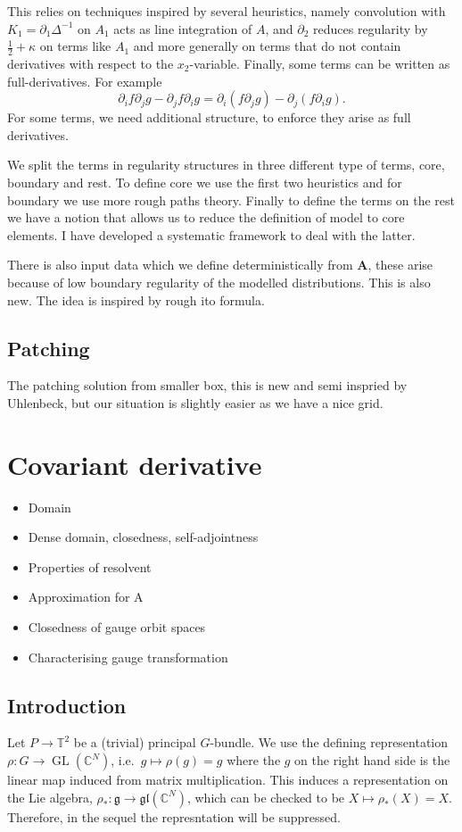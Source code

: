 \documentclass[12pt]{article}
\numberwithin{equation}{section}
\theoremstyle{definition}
\theoremstyle{remark}
\newcommand{\1}{\mathbf 1}
\newcommand{\<}{\langle}
\renewcommand{\>}{\rangle}
\newcommand{\bfA}{\mathbf A}
\newcommand{\fg}{\mathfrak g}
\newcommand{\bC}{\mathbb C}
\newcommand{\T}{\mathbb T}
\begin{document}
This relies on techniques inspired by several heuristics, namely convolution with $K_1=\partial_1 \Delta^{-1}$ on $A_1$ acts as line integration of $A$, and $\partial_2$ reduces regularity by $\frac 1 2+\kappa$ on terms like $A_1$ and more generally on terms that do not contain derivatives with respect to the $x_2$-variable. Finally, some terms can be written as full-derivatives. For example
\[
\partial_i f\partial_j g-\partial_j f\partial_i g=\partial_i (f\partial_j g)-\partial_j (f\partial_i g). 
\]
For some terms, we need additional structure, to enforce they arise as full derivatives. 

We split the terms in regularity structures in three different type of terms, core, boundary and rest. To define core we use the first two heuristics and for boundary we use more rough paths theory. Finally to define the terms on the rest we have a notion that allows us to reduce the definition of model to core elements. I have developed a systematic framework to deal with the latter. 

There is also input data which we define deterministically from $\bfA$, these arise because of low boundary regularity of the modelled distributions. This is also new. The idea is inspired by rough ito formula.  

\subsection{Patching}
The patching solution from smaller box, this is new and semi inspried by Uhlenbeck, but our situation is slightly easier as we have a nice grid.  


\section{Covariant derivative}
\begin{itemize}
    \item Domain
    \item Dense domain, closedness, self-adjointness
    \item Properties of resolvent
    \item Approximation for A
    \item Closedness of gauge orbit spaces
    \item Characterising gauge transformation
\end{itemize}
\subsection{Introduction}
 Let $P\to \T^2$ be a (trivial) principal $G$-bundle.  We use the defining representation $\rho:G\to \operatorname{GL}(\bC^N)$, i.e.\ $g\mapsto\rho(g)=g$ where the $g$ on the right hand side is the linear map induced from matrix multiplication. This induces a representation on the Lie algebra, $\rho_*:\fg\to \mathfrak{gl}(\bC^N)$, which can be checked to be $X\mapsto \rho_*(X)=X$. Therefore, in the sequel the represntation will be suppressed. 
\end{document}

